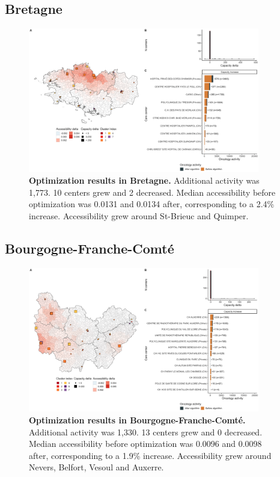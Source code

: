 \subsection*{Bretagne}

\begin{figure}[H]
    \includegraphics[width=0.9\textwidth]{images/camion/optim_region/optim_Bretagne.png}
    \centering
    \caption{
        \textbf{Optimization results in Bretagne.} Additional activity was 1,773. 10 centers grew and 2 decreased. Median accessibility before optimization was 0.0131 and 0.0134 after, corresponding to a 2.4\% increase. Accessibility grew around St-Brieuc and Quimper.
    }
\end{figure}

\subsection*{Bourgogne-Franche-Comté}

\begin{figure}[H]
    \includegraphics[width=0.9\textwidth]{images/camion/optim_region/optim_Bourgogne-Franche-Comte.png}
    \centering
    \caption{
        \textbf{Optimization results in Bourgogne-Franche-Comté.} Additional activity was 1,330. 13 centers grew and 0 decreased. Median accessibility before optimization was 0.0096 and 0.0098 after, corresponding to a 1.9\% increase. Accessibility grew around Nevers, Belfort, Vesoul and Auxerre.
    }
\end{figure}

